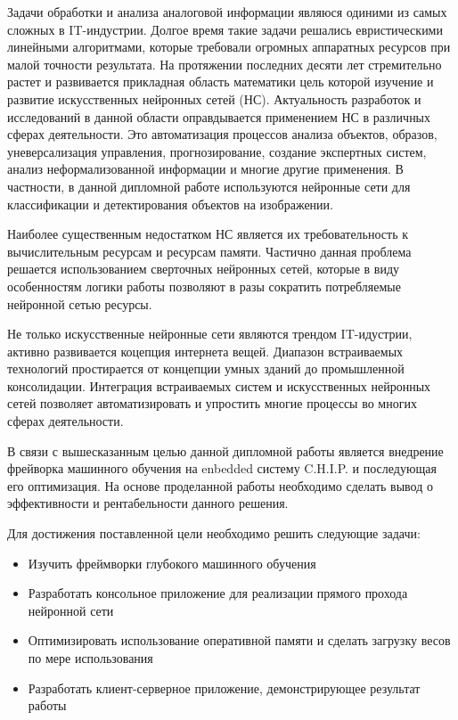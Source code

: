 \documentclass[a4paper,english,russian]{G2-105}
\begin{document}
\par Задачи обработки и анализа аналоговой информации являюся одиними из самых сложных в IT-индустрии. Долгое
время такие задачи решались евристическими линейными алгоритмами, которые требовали огромных аппаратных ресурсов при малой точности результата. На протяжении последних десяти лет стремительно растет и развивается прикладная область математики цель которой изучение и развитие искусственных нейронных сетей (НС). Актуальность разработок и исследований в данной области оправдывается применением НС в различных сферах деятельности. Это автоматизация процессов анализа объектов, образов, уневерсализация управления, прогнозирование, создание экспертных систем, анализ неформализованной информации и многие другие применения. В частности, в данной дипломной работе используются нейронные сети для классификации и детектирования объектов на изображении. 
\par Наиболее существенным недостатком НС является их требовательность к вычислительным ресурсам и ресурсам памяти. Частично данная проблема решается использованием сверточных нейронных сетей, которые в виду особенностям логики работы позволяют в разы сократить потребляемые нейронной сетью ресурсы.
\par Не только искусственные нейронные сети являются трендом IT-идустрии, активно развивается коцепция интернета вещей. Диапазон встраиваемых технологий простирается от концепции умных зданий до промышленной консолидации. Интеграция встраиваемых систем и искусственных нейронных сетей позволяет автоматизировать и упростить многие процессы во многих сферах деятельности.
\par В связи с вышесказанным целью данной дипломной работы является внедрение фрейворка машинного обучения на enbedded систему C.H.I.P. и последующая его оптимизация. На основе проделанной работы необходимо сделать вывод о эффективности и рентабельности данного решения. 
\par Для достижения поставленной цели необходимо решить следующие задачи:
\begin{itemize}
\item Изучить фреймворки глубокого машинного обучения
\item Разработать консольное приложение для реализации прямого прохода нейронной сети
\item Оптимизировать использование оперативной памяти и сделать загрузку весов по мере использования
\item Разработать клиент-серверное приложение, демонстрирующее результат работы
\end{itemize}
\newpage
\end{document}
